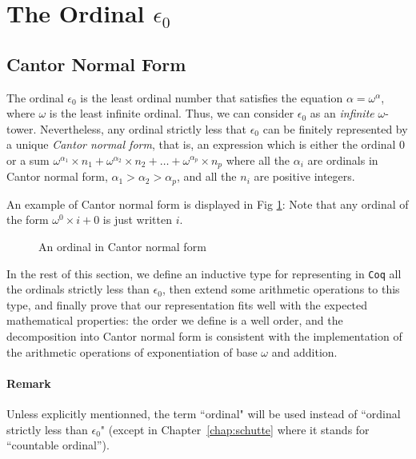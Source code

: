 \section{The Ordinal \texorpdfstring{\(\epsilon_0\)}{epsilon0}}
\label{sec:epsilon0-intro}

\subsection{Cantor Normal Form}

The ordinal \(\epsilon_0\) is the least ordinal number that satisfies 
the equation \(\alpha = \omega^\alpha\), where \(\omega\) is 
the least infinite ordinal. Thus, we can consider \(\epsilon_0\) as an
\emph{infinite} \(\omega\)-tower.
Nevertheless, 
any ordinal strictly less that \(\epsilon_0\) 
can be finitely represented by a unique  \emph{Cantor normal form}, 
that is, an expression  which is either  the ordinal \(0\) or 
a sum  \(\omega^{\alpha_1} \times n_1 + \omega^{\alpha_2} \times n_2 + 
  \dots + \omega^{\alpha_p} \times n_p\) where all the \(\alpha_i\) 
are ordinals in Cantor  normal form, \(\alpha_1 > \alpha_2 > \alpha_p\), 
and all the \(n_i\) are positive integers.

An example of Cantor normal form is displayed in Fig \ref{fig:cnf-example}:
Note that  any ordinal of
the form \(\omega^0 \times i + 0\) is just written \(i\).

\begin{figure}[htb]
\centering
{}
\caption{\label{fig:cnf-example}
An ordinal in Cantor normal form}
\end{figure}




In the rest of this section, we define an inductive type for representing in \texttt{Coq}
all the ordinals strictly  less than  \(\epsilon_0\), then extend some arithmetic operations
to this type, and finally prove that our representation fits well with 
the expected mathematical properties: the order we define is a well order, 
and the decomposition into Cantor normal form  is consistent 
with the implementation of the arithmetic operations of exponentiation of base \(\omega\) 
and addition.

\paragraph*{Remark}
\label{sec:orgheadline65}
Unless explicitly mentionned, the term ``ordinal" will be used instead of
``ordinal strictly less than \(\epsilon_0\)" (except in Chapter~\ref{chap:schutte} where it stands for ``countable ordinal'').



